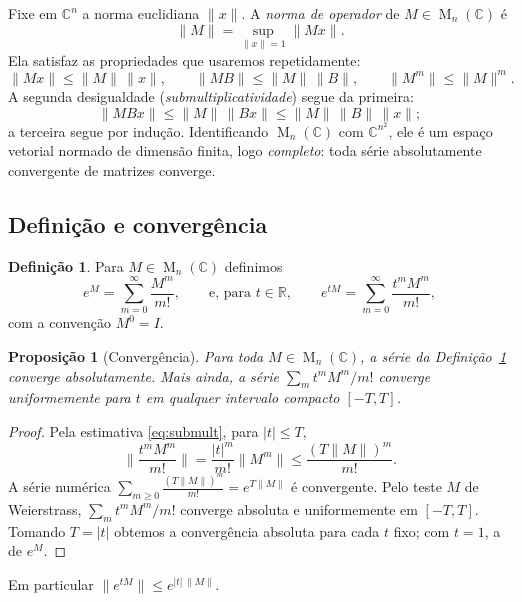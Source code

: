 \documentclass[11pt,a4paper]{amsart}
\newcommand{\R}{\mathbb{R}}
\newcommand{\C}{\mathbb{C}}
\newcommand{\norm}[1]{\lVert #1\rVert}
\DeclareMathOperator{\Mat}{M}
\theoremstyle{plain}
\newtheorem{proposicao}[teorema]{Proposição}
\theoremstyle{definition}
\newtheorem{definicao}[teorema]{Definição}
\theoremstyle{remark}
\begin{document}
Fixe em $\C^n$ a norma euclidiana $\norm{x}$. A \emph{norma de operador} de
$M\in\Mat_n(\C)$ \'e
\[
  \norm{M} = \sup_{\norm{x}=1}\norm{Mx}.
\]
Ela satisfaz as propriedades que usaremos repetidamente:
\begin{equation}\label{eq:submult}
  \norm{Mx}\le \norm{M}\,\norm{x},
  \qquad
  \norm{MB}\le\norm{M}\,\norm{B},
  \qquad
  \norm{M^m}\le\norm{M}^m .
\end{equation}
A segunda desigualdade (\emph{submultiplicatividade}) segue da primeira:
\[
  \norm{MBx}\le\norm{M}\,\norm{Bx}\le\norm{M}\,\norm{B}\,\norm{x};
\]
a terceira segue por indu\c{c}\~ao. Identificando $\Mat_n(\C)$ com $\C^{n^2}$, ele \'e um
espa\c{c}o vetorial normado de dimens\~ao finita, logo \emph{completo}: toda
s\'erie absolutamente convergente de matrizes converge.

\subsection{Defini\c{c}\~ao e converg\^encia}

\begin{definicao}\label{def:exp}
Para $M\in\Mat_n(\C)$ definimos
\[
  e^{M} = \sum_{m=0}^{\infty}\frac{M^m}{m!},
  \qquad\text{e, para } t\in\R,\qquad
  e^{tM} = \sum_{m=0}^{\infty}\frac{t^m M^m}{m!},
\]
com a conven\c{c}\~ao $M^0 = I$.
\end{definicao}

\begin{proposicao}[Converg\^encia]\label{prop:conv}
Para toda $M\in\Mat_n(\C)$, a s\'erie da Defini\c{c}\~ao~\ref{def:exp}
converge absolutamente. Mais ainda, a s\'erie $\sum_m t^m M^m/m!$ converge
\emph{uniformemente} para $t$ em qualquer intervalo compacto $[-T,T]$.
\end{proposicao}

\begin{proof}
Pela estimativa \eqref{eq:submult}, para $|t|\le T$,
\[
  \norm{\frac{t^m M^m}{m!}} = \frac{|t|^m}{m!}\norm{M^m}
  \le \frac{(T\norm{M})^m}{m!}.
\]
A s\'erie num\'erica $\sum_{m\ge0}\frac{(T\norm{M})^m}{m!} = e^{T\norm{M}}$
\'e convergente. Pelo teste $M$ de Weierstrass, $\sum_m t^mM^m/m!$ converge
absoluta e uniformemente em $[-T,T]$. Tomando $T=|t|$ obtemos a
converg\^encia absoluta para cada $t$ fixo; com $t=1$, a de $e^M$.
\end{proof}

Em particular $\norm{e^{tM}}\le e^{|t|\,\norm{M}}$.

\end{document}
